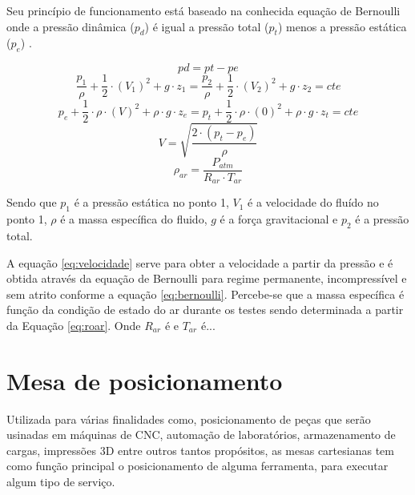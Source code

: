 Seu princípio de funcionamento está baseado na conhecida equação de Bernoulli onde 
a pressão dinâmica ($p_{d}$) é igual a pressão total ($p_{t}$) menos a pressão estática ($p_{e}$) \cite{pritchard2005fox}.

\begin{equation}\label{eq:pdinamica}
    pd = pt - pe
\end{equation}
\begin{equation}\label{eq:bernoulli}
    \frac{p_{1}}{\rho} + \frac{1}{2} \cdot (V_{1})^{2} + g \cdot z_{1} = \frac{p_{2}}{\rho} + \frac{1}{2} \cdot (V_{2})^{2} + g \cdot z_{2} = cte  
\end{equation}
\begin{equation}\label{eq:binicial}
    p_{e} + \frac{1}{2} \cdot \rho \cdot (V)^{2} + \rho \cdot g \cdot z_{e} = p_{t} + \frac{1}{2} \cdot \rho \cdot (0)^{2} + \rho \cdot g \cdot z_{t} = cte  
\end{equation}
\begin{equation}\label{eq:velocidade}
    V = \sqrt{\frac{2 \cdot (p_{t} - p_{e})}{\rho}}
\end{equation}
\begin{equation}\label{eq:roar}
    \rho_{ar} = \frac{P_{atm}}{R_{ar} \cdot T_{ar}}
\end{equation}

Sendo que $p_{1}$ é a pressão estática no ponto 1, $V_{1}$ é a velocidade do fluído no ponto 1, $\rho$ 
é a massa específica do fluido, $g$ é a força gravitacional e $p_{2}$ é a pressão total.

A equação \ref{eq:velocidade} serve para obter a velocidade a partir da pressão e é obtida 
através da equação de Bernoulli para regime permanente, incompressível e sem atrito 
conforme a equação \ref{eq:bernoulli}. Percebe-se que a massa específica é função da condição 
de estado do ar durante os testes sendo determinada a partir da Equação \ref{eq:roar}. 
Onde $R_{ar}$ é e $T_{ar}$ é...

\section{Mesa de posicionamento}\label{sec:mesa}

Utilizada para várias finalidades como, posicionamento de peças que serão usinadas em máquinas de 
\ac{CNC}, automação de laboratórios, armazenamento de cargas, impressões 3D entre 
outros tantos propósitos, as mesas cartesianas tem como função principal o posicionamento de alguma 
ferramenta, para executar algum tipo de serviço.

